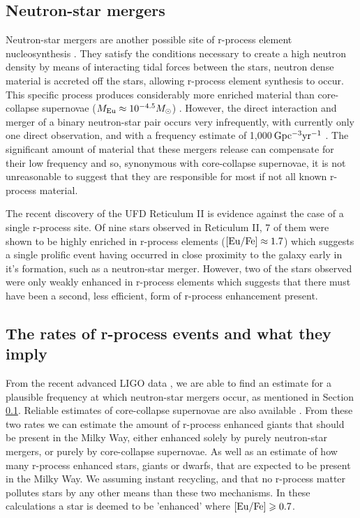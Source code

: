 \documentclass[a4paper,fleqn,usenatbib]{mnras}
\begin{document}
	\subsection{Neutron-star mergers}
	\label{NSmerg}
	Neutron-star mergers are another possible site of r-process element nucleosynthesis \citep{Kasen2017,Hotok2013,Drout2017}. They satisfy the conditions necessary to create a high neutron density by means of interacting tidal forces between the stars, neutron dense material is accreted off the stars, allowing r-process element synthesis to occur. This specific process produces considerably more enriched material than core-collapse supernovae ($M_{\rm{Eu}}\approx10^{-4.5} M_{\odot}$) \citep{Goriely2011}. However, the direct interaction and merger of a binary neutron-star pair occurs very infrequently, with currently only one direct observation, and with a frequency estimate of 1,000$\,\rm{Gpc^{-3}yr^{-1}}$ \citep{LIGO2016}. The significant amount of material that these mergers release can compensate for their low frequency and so, synonymous with core-collapse supernovae, it is not unreasonable to suggest that they are responsible for most if not all known r-process material. 

	The recent discovery of the UFD Reticulum II \citep{Ji2016} is evidence against the case of a single r-process site. Of nine stars observed in Reticulum II, 7 of them were shown to be highly enriched in r-process elements ($\rm{[Eu/Fe]\approx1.7}$) which suggests a single prolific event having occurred in close proximity to the galaxy early in it's formation, such as a neutron-star merger. However, two of the stars observed were only weakly enhanced in r-process elements which suggests that there must have been a second, less efficient, form of r-process enhancement present.
	
	\subsection{The rates of r-process events and what they imply}
	\label{rates}
	From the recent advanced LIGO data \citep{LIGO2016}, we are able to find an estimate for a plausible frequency at which neutron-star mergers occur, as mentioned in Section \ref{NSmerg}. Reliable estimates of core-collapse supernovae are also available \citep{Li2011}. From these two rates we can estimate the amount of r-process enhanced giants that should be present in the Milky Way, either enhanced solely by purely neutron-star mergers, or purely by core-collapse supernovae. As well as an estimate of how many r-process enhanced stars, giants or dwarfs, that are expected to be present in the Milky Way. We assuming instant recycling, and that no r-process matter pollutes stars by any other means than these two mechanisms. In these calculations a star is deemed to be 'enhanced' where $[{\rm Eu/Fe}] \geq 0.7$.
	
\end{document}
